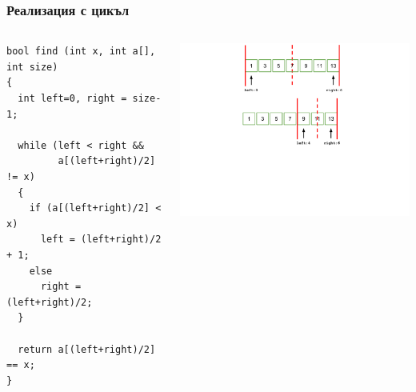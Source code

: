 \documentclass{beamer}
\begin{document}
\begin{frame}[fragile]
\frametitle{Реализация с цикъл}



\begin{columns}[t]
  \begin{column}{0.5\textwidth}

\begin{lstlisting}
bool find (int x, int a[], int size)
{
  int left=0, right = size-1;

  while (left < right && 
         a[(left+right)/2] != x)
  {
    if (a[(left+right)/2] < x)
      left = (left+right)/2 + 1;
    else
      right = (left+right)/2;
  }

  return a[(left+right)/2] == x;
}
\end{lstlisting}


  \end{column}
  \begin{column}{0.5\textwidth}
\vspace*{-1pt}
\hspace*{-50pt}
\includegraphics[width=10cm]{images/binsearch_smaller} 

  \end{column}
\end{columns}



\end{frame}
\end{document}
